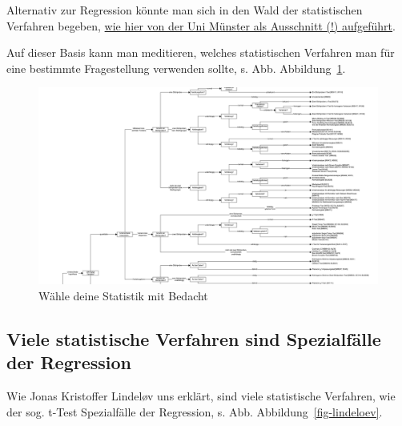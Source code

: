 \documentclass[
  a4paper,
  DIV=11]{scrreprt}
\theoremstyle{definition}
\theoremstyle{remark}
\begin{document}
Alternativ zur Regression könnte man sich in den Wald der statistischen
Verfahren begeben,
\href{https://web.archive.org/web/20091029162244/http://www.wiwi.uni-muenster.de/ioeb/en/organisation/pfaff/stat_overview_table.html}{wie
hier von der Uni Münster als Ausschnitt (!) aufgeführt}.

Auf dieser Basis kann man meditieren, welches statistischen Verfahren
man für eine bestimmte Fragestellung verwenden sollte, s. Abb.
Abbildung~\ref{fig-choose-test}.

\begin{figure}

{\centering \includegraphics{./img/choose-test.png}

}

\caption{\label{fig-choose-test}Wähle deine Statistik mit Bedacht}

\end{figure}

\hypertarget{viele-statistische-verfahren-sind-spezialfuxe4lle-der-regression}{%
\subsection{Viele statistische Verfahren sind Spezialfälle der
Regression}\label{viele-statistische-verfahren-sind-spezialfuxe4lle-der-regression}}

Wie Jonas Kristoffer Lindeløv uns erklärt, sind viele statistische
Verfahren, wie der sog. t-Test Spezialfälle der Regression, s. Abb.
Abbildung~\ref{fig-lindeloev}.
\end{document}
